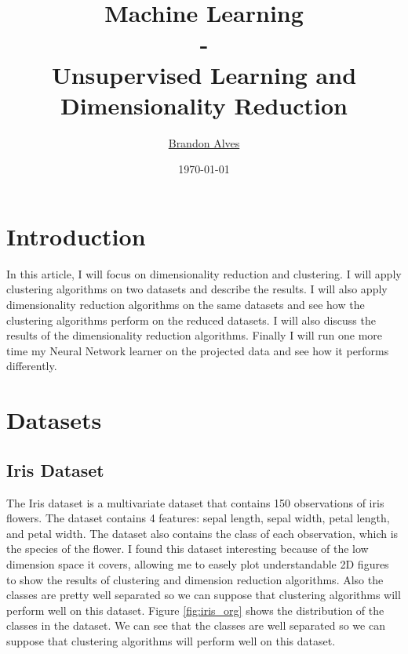 \documentclass[twocolumn, 10pt]{article}
\title{
	Machine Learning
	\\-\\
	Unsupervised Learning and Dimensionality Reduction
}
\author{
	\href{mailto:brandon.alves@gatech.edu}{Brandon Alves}
}
\date{\today}
\begin{document}
	\maketitle
	\thispagestyle{empty}
	\tableofcontents
	\section{Introduction}
		In this article, I will focus on dimensionality reduction and clustering. I will apply clustering algorithms on two datasets and describe the results. I will also apply dimensionality reduction algorithms on the same datasets and see how the clustering algorithms perform on the reduced datasets. I will also discuss the results of the dimensionality reduction algorithms. Finally I will run one more time my Neural Network learner on the projected data and see how it performs differently.
	\section{Datasets}
		\subsection{Iris Dataset}
			The Iris dataset is a multivariate dataset that contains 150 observations of iris flowers. The dataset contains 4 features: sepal length, sepal width, petal length, and petal width. The dataset also contains the class of each observation, which is the species of the flower. I found this dataset interesting because of the low dimension space it covers, allowing me to easely plot understandable 2D figures to show the results of clustering and dimension reduction algorithms. Also the classes are pretty well separated so we can suppose that clustering algorithms will perform well on this dataset. Figure \ref{fig:iris_org} shows the distribution of the classes in the dataset. We can see that the classes are well separated so we can suppose that clustering algorithms will perform well on this dataset.
\end{document}

